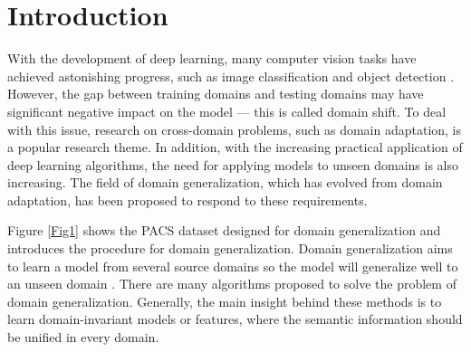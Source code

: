 \documentclass[a4paper,fleqn]{cas-dc}
\begin{document}
\section{Introduction}
\label{sec: Introduction}
With the development of deep learning, many computer vision tasks have achieved astonishing progress, such as image classification \cite{resnet,vit} and object detection \cite{fastrcnn}. However, the gap between training domains and testing domains may have significant negative impact on the model --- this is called domain shift. To deal with this issue, research on cross-domain problems, such as domain adaptation, is a popular research theme. In addition, with the increasing practical application of deep learning algorithms, the need for applying models to unseen domains is also increasing. The field of domain generalization, which has evolved from domain adaptation, has been proposed to respond to these requirements.

Figure \ref{Fig1} shows the PACS\cite{PACS} dataset designed for domain generalization and introduces the procedure for domain generalization. Domain generalization aims to learn a model from several source domains so the model will generalize well to an unseen domain \cite{domaingen}. There are many algorithms proposed to solve the problem of domain generalization\cite{mixstyle,swad,coral,DICA}. Generally, the main insight behind these methods is to learn domain-invariant models or features, where the semantic information should be unified in every domain.  
\end{document}
